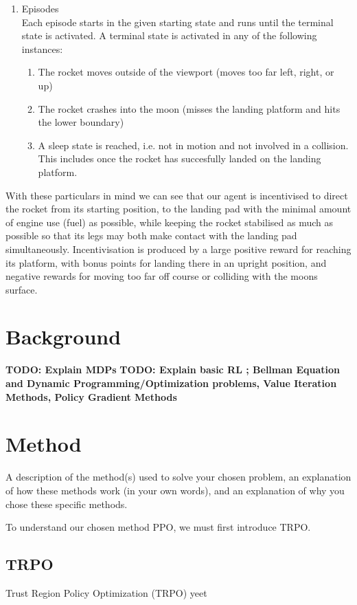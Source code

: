 \documentclass{article}
\begin{document}
\begin{enumerate}
  \item Episodes\\
  Each episode starts in the given starting state and runs until the terminal state is activated. A terminal state is activated in any of the following instances:
  \begin{enumerate}
    \item The rocket moves outside of the viewport (moves too far left, right, or up)
    \item The rocket crashes into the moon (misses the landing platform and hits the lower boundary)
    \item A sleep state is reached, i.e. not in motion and not involved in a collision. This includes once the rocket has succesfully landed on the landing platform.
  \end{enumerate}
\end{enumerate}

With these particulars in mind we can see that our agent is incentivised to direct the rocket from its starting position, to the landing pad with the minimal amount of engine use (fuel) as possible, while keeping the rocket stabilised as much as possible so that its legs may both make contact with the landing pad simultaneously. Incentivisation is produced by a large positive reward for reaching its platform, with bonus points for landing there in an upright position, and negative rewards for moving too far off course or colliding with the moons surface.


\section{Background}
\textbf{TODO: Explain MDPs}
\textbf{TODO: Explain basic RL ; Bellman Equation and Dynamic Programming/Optimization problems, Value Iteration Methods, Policy Gradient Methods}

\section{Method}
A description of the method(s) used to solve your chosen problem, an explanation
of how these methods work (in your own words), and an explanation of why you chose these
specific methods.\\\newline

To understand our chosen method PPO, we must first introduce TRPO. 
\subsection{TRPO}
Trust Region Policy Optimization (TRPO) \citep{pmlr-v37-schulman15} yeet 
\end{document}

